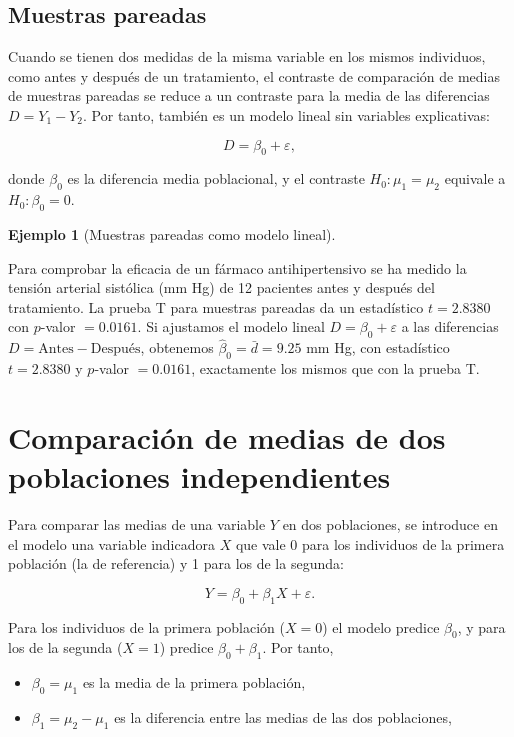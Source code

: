 \documentclass[
  spanish,
  a4paper,
]{scrreport}
\providecommand{\tightlist}{%
  \setlength{\itemsep}{0pt}\setlength{\parskip}{0pt}}
\theoremstyle{plain}
\theoremstyle{definition}
\newtheorem{example}{Ejemplo}[chapter]
\theoremstyle{definition}
\theoremstyle{remark}
\begin{document}
\subsection{Muestras pareadas}\label{muestras-pareadas}

Cuando se tienen dos medidas de la misma variable en los mismos
individuos, como antes y después de un tratamiento, el contraste de
comparación de medias de muestras pareadas se reduce a un contraste para
la media de las diferencias \(D=Y_1-Y_2\). Por tanto, también es un
modelo lineal sin variables explicativas:

\[
D = \beta_0 + \varepsilon,
\]

donde \(\beta_0\) es la diferencia media poblacional, y el contraste
\(H_0: \mu_1=\mu_2\) equivale a \(H_0: \beta_0=0\).

\begin{example}[Muestras pareadas como modelo
lineal]\protect\hypertarget{exm-pareadas-modelo-lineal}{}\label{exm-pareadas-modelo-lineal}

Para comprobar la eficacia de un fármaco antihipertensivo se ha medido
la tensión arterial sistólica (mm Hg) de 12 pacientes antes y después
del tratamiento. La prueba T para muestras pareadas da un estadístico
\(t=2.8380\) con \(p\)-valor \(= 0.0161\). Si ajustamos el modelo lineal
\(D=\beta_0+\varepsilon\) a las diferencias
\(D=\text{Antes}-\text{Después}\), obtenemos \(\hat\beta_0=\bar d=9.25\)
mm Hg, con estadístico \(t=2.8380\) y \(p\)-valor \(= 0.0161\),
exactamente los mismos que con la prueba T.

\end{example}

\section{Comparación de medias de dos poblaciones
independientes}\label{comparaciuxf3n-de-medias-de-dos-poblaciones-independientes}

Para comparar las medias de una variable \(Y\) en dos poblaciones, se
introduce en el modelo una variable indicadora \(X\) que vale 0 para los
individuos de la primera población (la de referencia) y 1 para los de la
segunda:

\[
Y = \beta_0 + \beta_1 X + \varepsilon.
\]

Para los individuos de la primera población (\(X=0\)) el modelo predice
\(\beta_0\), y para los de la segunda (\(X=1\)) predice
\(\beta_0+\beta_1\). Por tanto,

\begin{itemize}
\tightlist
\item
  \(\beta_0 = \mu_1\) es la media de la primera población,
\item
  \(\beta_1 = \mu_2-\mu_1\) es la diferencia entre las medias de las dos
  poblaciones,
\end{itemize}
\end{document}
